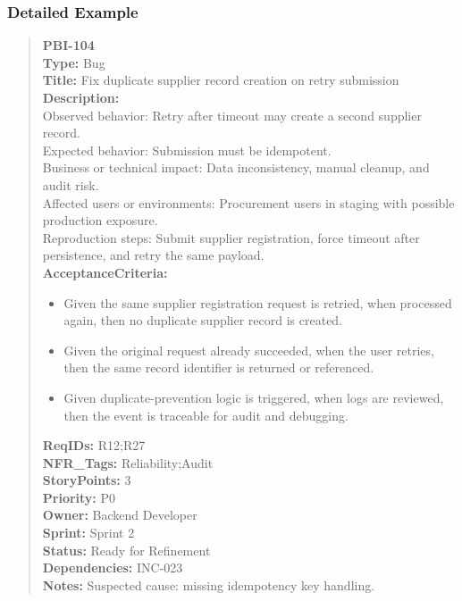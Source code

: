 \documentclass[11pt,a4paper]{article}
\begin{document}
\subsubsection*{Detailed Example}
\begin{quote}
\textbf{PBI-104} \\
\textbf{Type:} Bug \\
\textbf{Title:} Fix duplicate supplier record creation on retry submission \\

\textbf{Description:} \\
Observed behavior: Retry after timeout may create a second supplier record. \\
Expected behavior: Submission must be idempotent. \\
Business or technical impact: Data inconsistency, manual cleanup, and audit risk. \\
Affected users or environments: Procurement users in staging with possible production exposure. \\
Reproduction steps: Submit supplier registration, force timeout after persistence, and retry the same payload. \\

\textbf{AcceptanceCriteria:}
\begin{itemize}[leftmargin=1.5em]
    \item Given the same supplier registration request is retried, when processed again, then no duplicate supplier record is created.
    \item Given the original request already succeeded, when the user retries, then the same record identifier is returned or referenced.
    \item Given duplicate-prevention logic is triggered, when logs are reviewed, then the event is traceable for audit and debugging.
\end{itemize}

\textbf{ReqIDs:} R12;R27 \\
\textbf{NFR\_Tags:} Reliability;Audit \\
\textbf{StoryPoints:} 3 \\
\textbf{Priority:} P0 \\
\textbf{Owner:} Backend Developer \\
\textbf{Sprint:} Sprint 2 \\
\textbf{Status:} Ready for Refinement \\
\textbf{Dependencies:} INC-023 \\
\textbf{Notes:} Suspected cause: missing idempotency key handling.
\end{quote}
\end{document}
